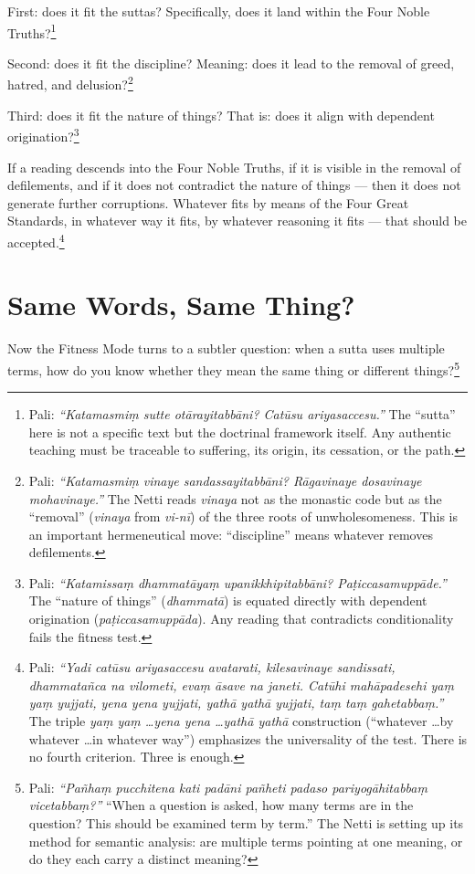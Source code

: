 First: does it fit the suttas? Specifically, does it land within the Four Noble Truths?\footnote{Pali: \textit{``Katamasmiṃ sutte otārayitabbāni? Catūsu ariyasaccesu.''} The ``sutta'' here is not a specific text but the doctrinal framework itself. Any authentic teaching must be traceable to suffering, its origin, its cessation, or the path.}

Second: does it fit the discipline? Meaning: does it lead to the removal of greed, hatred, and delusion?\footnote{Pali: \textit{``Katamasmiṃ vinaye sandassayitabbāni? Rāgavinaye dosavinaye mohavinaye.''} The Netti reads \textit{vinaya} not as the monastic code but as the ``removal'' (\textit{vinaya} from \textit{vi-nī}) of the three roots of unwholesomeness. This is an important hermeneutical move: ``discipline'' means whatever removes defilements.}

Third: does it fit the nature of things? That is: does it align with dependent origination?\footnote{Pali: \textit{``Katamissaṃ dhammatāyaṃ upanikkhipitabbāni? Paṭiccasamuppāde.''} The ``nature of things'' (\textit{dhammatā}) is equated directly with dependent origination (\textit{paṭiccasamuppāda}). Any reading that contradicts conditionality fails the fitness test.}

If a reading descends into the Four Noble Truths, if it is visible in the removal of defilements, and if it does not contradict the nature of things --- then it does not generate further corruptions. Whatever fits by means of the Four Great Standards, in whatever way it fits, by whatever reasoning it fits --- that should be accepted.\footnote{Pali: \textit{``Yadi catūsu ariyasaccesu avatarati, kilesavinaye sandissati, dhammatañca na vilometi, evaṃ āsave na janeti. Catūhi mahāpadesehi yaṃ yaṃ yujjati, yena yena yujjati, yathā yathā yujjati, taṃ taṃ gahetabbaṃ.''} The triple \textit{yaṃ yaṃ \ldots yena yena \ldots yathā yathā} construction (``whatever \ldots by whatever \ldots in whatever way'') emphasizes the universality of the test. There is no fourth criterion. Three is enough.}

\section*{Same Words, Same Thing?}

Now the Fitness Mode turns to a subtler question: when a sutta uses multiple terms, how do you know whether they mean the same thing or different things?\footnote{Pali: \textit{``Pañhaṃ pucchitena kati padāni pañheti padaso pariyogāhitabbaṃ vicetabbaṃ?''} ``When a question is asked, how many terms are in the question? This should be examined term by term.'' The Netti is setting up its method for semantic analysis: are multiple terms pointing at one meaning, or do they each carry a distinct meaning?}

